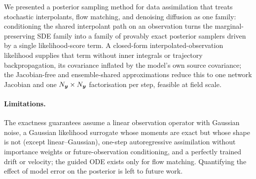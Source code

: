 We presented a posterior sampling method for data assimilation that treats stochastic interpolants, flow matching, and denoising diffusion as one family: conditioning the shared interpolant path on an observation turns the marginal-preserving SDE family into a family of provably exact posterior samplers driven by a single likelihood-score term. A closed-form interpolated-observation likelihood supplies that term without inner integrals or trajectory backpropagation, its covariance inflated by the model's own source covariance; the Jacobian-free and ensemble-shared approximations reduce this to one network Jacobian and one $N_{\boldsymbol{y}}\times N_{\boldsymbol{y}}$ factorisation per step, feasible at field scale.

\paragraph{Limitations.}
The exactness guarantees assume a linear observation operator with Gaussian noise, a Gaussian likelihood surrogate whose moments are exact but whose shape is not (except linear--Gaussian), one-step autoregressive assimilation without importance weights or future-observation conditioning, and a perfectly trained drift or velocity; the guided ODE exists only for flow matching. Quantifying the effect of model error on the posterior is left to future work.
